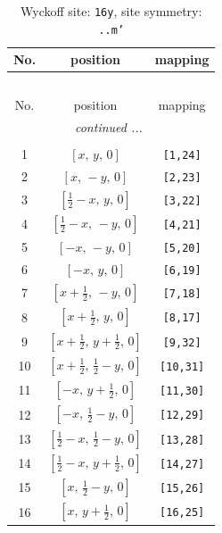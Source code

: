 \documentclass[fleqn,8pt]{jsarticle}
\begin{document}
\renewcommand{\arraystretch}{1.2}
\begin{longtable}{ccc}
\caption{Wyckoff site: {\tt 16y}, site symmetry: {\tt ..m'}}
 \\
 \hline \hline
No. & position & mapping \\ \hline \endfirsthead

\multicolumn{2}{l}{\tablename\ \thetable{}} \\
 \hline \hline
No. & position & mapping \\ \hline \endhead

 \hline \hline
\multicolumn{2}{r}{\footnotesize\it continued ...} \\ \endfoot

 \hline \hline
\multicolumn{2}{r}{} \\ \endlastfoot

1 & $\left[ x,\, y,\, 0 \right]$ & {\tt [1,24]} \\ \hline
2 & $\left[ x,\, - y,\, 0 \right]$ & {\tt [2,23]} \\ \hline
3 & $\left[ \frac{1}{2} - x,\, y,\, 0 \right]$ & {\tt [3,22]} \\ \hline
4 & $\left[ \frac{1}{2} - x,\, - y,\, 0 \right]$ & {\tt [4,21]} \\ \hline
5 & $\left[ - x,\, - y,\, 0 \right]$ & {\tt [5,20]} \\ \hline
6 & $\left[ - x,\, y,\, 0 \right]$ & {\tt [6,19]} \\ \hline
7 & $\left[ x + \frac{1}{2},\, - y,\, 0 \right]$ & {\tt [7,18]} \\ \hline
8 & $\left[ x + \frac{1}{2},\, y,\, 0 \right]$ & {\tt [8,17]} \\ \hline
9 & $\left[ x + \frac{1}{2},\, y + \frac{1}{2},\, 0 \right]$ & {\tt [9,32]} \\ \hline
10 & $\left[ x + \frac{1}{2},\, \frac{1}{2} - y,\, 0 \right]$ & {\tt [10,31]} \\ \hline
11 & $\left[ - x,\, y + \frac{1}{2},\, 0 \right]$ & {\tt [11,30]} \\ \hline
12 & $\left[ - x,\, \frac{1}{2} - y,\, 0 \right]$ & {\tt [12,29]} \\ \hline
13 & $\left[ \frac{1}{2} - x,\, \frac{1}{2} - y,\, 0 \right]$ & {\tt [13,28]} \\ \hline
14 & $\left[ \frac{1}{2} - x,\, y + \frac{1}{2},\, 0 \right]$ & {\tt [14,27]} \\ \hline
15 & $\left[ x,\, \frac{1}{2} - y,\, 0 \right]$ & {\tt [15,26]} \\ \hline
16 & $\left[ x,\, y + \frac{1}{2},\, 0 \right]$ & {\tt [16,25]} \\
\end{longtable}
\end{document}
